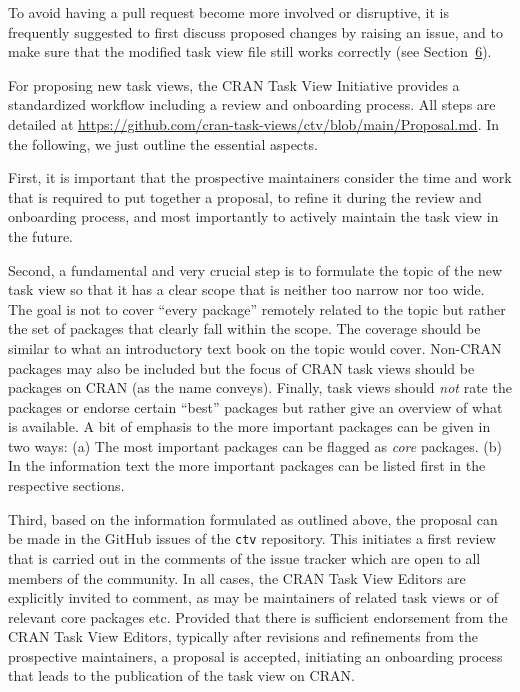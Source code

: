 To avoid having a pull request become more involved or disruptive, it is
frequently suggested to first discuss proposed changes by raising an issue,
and to make sure that the modified task view
file still works correctly (see Section~\hyperref[sec:format]{6}).

For proposing new task views, the CRAN Task View Initiative provides a standardized
workflow including a review and onboarding process. All steps are detailed at
\url{https://github.com/cran-task-views/ctv/blob/main/Proposal.md}. In the following,
we just outline the essential aspects.

First, it is important that the prospective maintainers consider the time and work
that is required to put together a proposal, to refine it during the review and
onboarding process, and most importantly to actively maintain the task view in the
future.

Second, a fundamental and very crucial step is to formulate the topic of the new
task view so that it has a clear scope that is neither too narrow nor too wide.
The goal is not to cover ``every package'' remotely related to the topic but rather
the set of packages that clearly fall within the scope. The coverage should be similar to
what an introductory text book on the topic would cover. Non-CRAN packages may also
be included but the focus of CRAN task views should be packages on CRAN (as the name conveys).
Finally, task views should \emph{not} rate the packages or endorse certain ``best'' packages
but rather give an overview of what is available. A bit of emphasis to the more
important packages can be given in two ways: (a) The most important packages can be
flagged as \emph{core} packages. (b) In the information text the more important packages
can be listed first in the respective sections.

Third, based on the information formulated as outlined above, the proposal can be
made in the GitHub issues of the \texttt{ctv} repository. This initiates a first review
that is carried out in the comments of the issue tracker which are open to all
members of the community. In all cases, the CRAN Task View Editors are explicitly
invited to comment, as may be maintainers of related task views or of relevant core
packages etc. Provided that there is sufficient endorsement from the CRAN Task View
Editors, typically after revisions and refinements from the prospective maintainers,
a proposal is accepted, initiating an onboarding process that leads to the publication
of the task view on CRAN.

